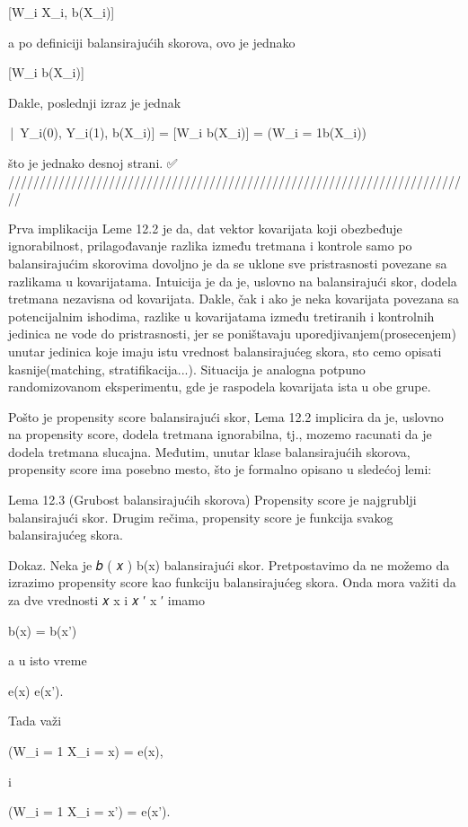\documentclass[12pt, a4paper]{article}
\begin{document}
[W_i \mid X_i, b(X_i)]


a po definiciji balansirajućih skorova, ovo je jednako

[W_i \mid b(X_i)]


Dakle, poslednji izraz je jednak

\Big[\mathbb{E}[W_i \mid b(X_i)] \,\Big|\, Y_i(0), Y_i(1), b(X_i)\Big] 
= [W_i \mid b(X_i)] 
= \Pr(W_i = 1\mid b(X_i))


što je jednako desnoj strani. ✅
//////////////////////////////////////////////////////////////////////////

Prva implikacija Leme 12.2 je da, dat vektor kovarijata koji obezbeđuje ignorabilnost, prilagođavanje razlika između tretmana i kontrole samo po balansirajućim skorovima dovoljno je da se uklone sve pristrasnosti povezane sa razlikama u kovarijatama. Intuicija je da je, uslovno na balansirajući skor, dodela tretmana nezavisna od kovarijata. Dakle, čak i ako je neka kovarijata povezana sa potencijalnim ishodima, razlike u kovarijatama između tretiranih i kontrolnih jedinica ne vode do pristrasnosti, jer se poništavaju uporedjivanjem(prosecenjem) unutar jedinica koje imaju istu vrednost balansirajućeg skora, sto cemo opisati kasnije(matching, stratifikacija...). Situacija je analogna potpuno randomizovanom eksperimentu, gde je raspodela kovarijata ista u obe grupe.

Pošto je propensity score balansirajući skor, Lema 12.2 implicira da je, uslovno na propensity score, dodela tretmana ignorabilna, tj., mozemo racunati da je dodela tretmana slucajna. Međutim, unutar klase balansirajućih skorova, propensity score ima posebno mesto, što je formalno opisano u sledećoj lemi:

Lema 12.3 (Grubost balansirajućih skorova)
Propensity score je najgrublji balansirajući skor. Drugim rečima, propensity score je funkcija svakog balansirajućeg skora.

Dokaz. Neka je 
𝑏
(
𝑥
)
b(x) balansirajući skor. Pretpostavimo da ne možemo da izrazimo propensity score kao funkciju balansirajućeg skora. Onda mora važiti da za dve vrednosti 
𝑥
x i 
𝑥
′
x
′
 imamo

b(x) = b(x')


a u isto vreme

e(x) \neq e(x').


Tada važi

\Pr(W_i = 1 \mid X_i = x) = e(x),


i

\Pr(W_i = 1 \mid X_i = x') = e(x').
\end{document}
